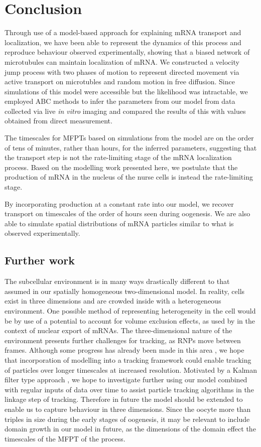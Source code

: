 \documentclass[twocolumn]{biophys}
\begin{document}
\section{Conclusion} \label{Conclusions}
Through use of a model-based approach for explaining mRNA transport and localization, we have been able to represent the dynamics of this process and reproduce behaviour observed experimentally, showing that a biased network of microtubules can maintain localization of mRNA.
We constructed a velocity jump process with two phases of motion to represent directed movement via active transport on microtubles and random motion in free diffusion.
Since simulations of this model were accessible but the likelihood was intractable, we employed ABC methods to infer the parameters from our model from data collected via live \textit{in vitro} imaging and compared the results of this with values obtained from direct measurement.

The timescales for MFPTs based on simulations from the model are on the order of tens of minutes, rather than hours, for the inferred parameters, suggesting that the transport step is not the rate-limiting stage of the mRNA localization process.
Based on the modelling work presented here, we postulate that the production of mRNA in the nucleus of the nurse cells is instead the rate-limiting stage.

By incorporating production at a constant rate into our model, we recover transport on timescales of the order of hours seen during oogenesis.
We are also able to simulate spatial distributions of mRNA particles similar to what is observed experimentally.  

\subsection{Further work}
The subcellular environment is in many ways drastically different to that assumed in our spatially homogeneous two-dimensional model.
In reality, cells exist in three dimensions and are crowded inside with a heterogeneous environment. 
One possible method of representing heterogeneity in the cell would be by use of a potential to account for volume exclusion effects, as used by \citet{isaacson2011influence} in the context of nuclear export of mRNAs.
The three-dimensional nature of the environment presents further challenges for tracking, as RNPs move between frames.
Although some progress has already been made in this area \citep{thompson2010three}, we hope that incorporation of modelling into a tracking framework could enable tracking of particles over longer timescales at increased resolution. 
Motivated by a Kalman filter type approach \citep{faragher2012understanding}, we hope to investigate further using our model combined with regular inputs of data over time to assist particle tracking algorithms in the linkage step of tracking.
Therefore in future the model should be extended to enable us to capture behaviour in three dimensions. 
Since the oocyte more than triples in size during the early stages of oogenesis, it may be relevant to include domain growth in our model in future, as the dimensions of the domain effect the timescales of the MFPT of the process.
\end{document}
